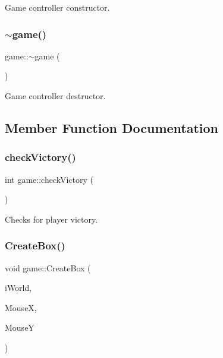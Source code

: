 Game controller constructor. 

\mbox{\label{classgame_ae87abd20c4d8a7906fa48e690a5f1d07}} 
\subsubsection{\texorpdfstring{$\sim$game()}{~game()}}
{\footnotesize\ttfamily game\+::$\sim$game (\begin{DoxyParamCaption}{ }\end{DoxyParamCaption})}



Game controller destructor. 



\subsection{Member Function Documentation}
\mbox{\label{classgame_a5297f3ca1e18dfc8c4efd718b54b4982}} 
\subsubsection{\texorpdfstring{check\+Victory()}{checkVictory()}}
{\footnotesize\ttfamily int game\+::check\+Victory (\begin{DoxyParamCaption}{ }\end{DoxyParamCaption})}



Checks for player victory. 

\mbox{\label{classgame_ae657176251e07dae30036032635322fc}} 
\subsubsection{\texorpdfstring{Create\+Box()}{CreateBox()}}
{\footnotesize\ttfamily void game\+::\+Create\+Box (\begin{DoxyParamCaption}\item[{b2\+World \&}]{i\+World,  }\item[{int}]{MouseX,  }\item[{int}]{MouseY }\end{DoxyParamCaption})}



